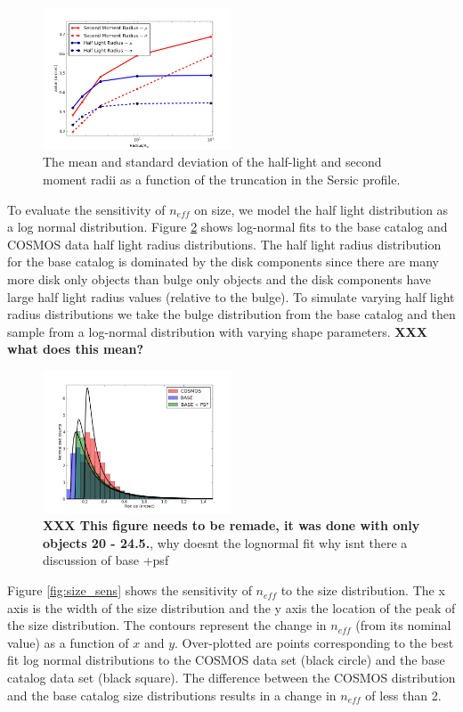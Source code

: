 \documentclass[]{article}
\begin{document}
\begin{figure}[ht]
\centering
\includegraphics[width=0.5\textwidth]{validation_figures/sec_mom_half_light_mean_sigma.png}
\caption{The mean and standard deviation of the half-light and second
 moment radii as a function of the truncation in the Sersic profile.}
\label{fig:mom_hl_line}
\end{figure}

To evaluate the sensitivity of $n_{eff}$ on size, we model the 
half light distribution as a log normal distribution.  Figure
\ref{fig:ln_fit} shows log-normal fits to the base catalog and COSMOS
data half light radius distributions.  The half light radius
distribution for the base catalog is dominated by the disk components
since there are many more disk only objects than bulge only objects
and the disk components have large half light radius values (relative
to the bulge).  To simulate varying half light radius distributions we
take the bulge distribution from the base catalog and then sample from
a log-normal distribution with varying shape parameters.
{\bf XXX what does this mean?}
\begin{figure}[H]
\centering
\includegraphics[width=0.5\textwidth]{validation_figures/ln_fit.png}
\caption{{\bf XXX This figure needs to be remade, it was done with
    only objects 20 - 24.5.}\label{fig:ln_fit}, why doesnt the
  lognormal fit why isnt there a discussion of base +psf}
\end{figure}

Figure \ref{fig:size_sens} shows the sensitivity of $n_{eff}$ to the
size distribution.  The x axis is the width of the size distribution
and the y axis the location of the peak of the size distribution. The
contours represent the change in $n_{eff}$ (from its nominal value) as
a function of $x$ and $y$. Over-plotted are points corresponding to
the best fit log normal distributions to the COSMOS data set (black
circle) and the base catalog data set (black square).  The difference
between the COSMOS distribution and the base catalog size distributions
results in a change in $n_{eff}$ of less than 2. 
\end{document}
